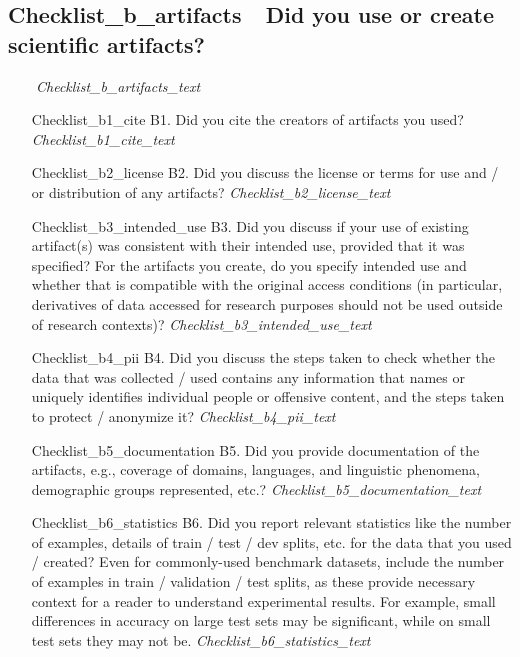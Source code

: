 \documentclass[11pt]{article}
\begin{document}
\subsection{{{Checklist_b_artifacts}}\ \ Did you use or create scientific artifacts?}
\ \ \ \ \textit{{{Checklist_b_artifacts_text}}}
\begin{itemize}
    \item[{{Checklist_b1_cite}}] B1. Did you cite the creators of artifacts you used?
    \newline\textit{{{Checklist_b1_cite_text}}}
    \item[{{Checklist_b2_license}}] B2. Did you discuss the license or terms for use and / or distribution of any artifacts?
    \newline\textit{{{Checklist_b2_license_text}}}
    \item[{{Checklist_b3_intended_use}}] B3. Did you discuss if your use of existing artifact(s) was consistent with their intended use, provided that it was specified? For the artifacts you create, do you specify intended use and whether that is compatible with the original access conditions (in particular, derivatives of data accessed for research purposes should not be used outside of research contexts)?
    \newline\textit{{{Checklist_b3_intended_use_text}}}
    \item[{{Checklist_b4_pii}}] B4. Did you discuss the steps taken to check whether the data that was collected / used contains any information that names or uniquely identifies individual people or offensive content, and the steps taken to protect / anonymize it?
    \newline\textit{{{Checklist_b4_pii_text}}}
    \item[{{Checklist_b5_documentation}}] B5. Did you provide documentation of the artifacts, e.g., coverage of domains, languages, and linguistic phenomena, demographic groups represented, etc.?
    \newline\textit{{{Checklist_b5_documentation_text}}}
    \item[{{Checklist_b6_statistics}}] B6. Did you report relevant statistics like the number of examples, details of train / test / dev splits, etc. for the data that you used / created? Even for commonly-used benchmark datasets, include the number of examples in train / validation / test splits, as these provide necessary context for a reader to understand experimental results. For example, small differences in accuracy on large test sets may be significant, while on small test sets they may not be.
    \newline\textit{{{Checklist_b6_statistics_text}}}
\end{itemize}
\end{document}
